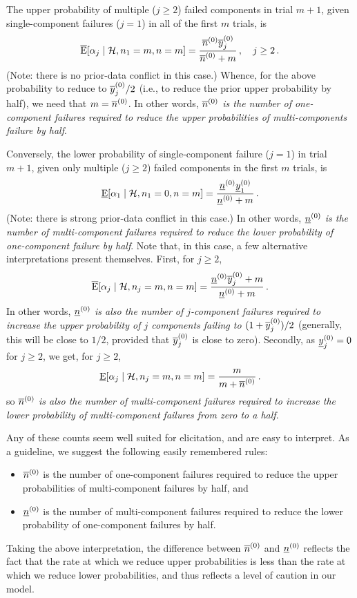 The upper probability of multiple ($j\ge 2$) failed components in trial $m+1$,
given single-component failures ($j=1$) in all of the first $m$ trials, is
\begin{equation*}
  \overline{\operatorname{E}}[\alpha_j\mid\mathcal{H}, n_1=m, n=m] = \frac{\overline{n}^{(0)}\overline{y}^{(0)}_j}{\overline{n}^{(0)} + m}\,, \quad j \ge 2\,.
\end{equation*}
(Note: there is no prior-data conflict in this case.)
Whence, for the above probability to reduce to $\overline{y}^{(0)}_j/2$
(i.e., to reduce the prior upper probability by half), we need that $m=\overline{n}^{(0)}$.
In other words, \emph{$\overline{n}^{(0)}$ is the number of one-component failures required
to reduce the upper probabilities of multi-components failure by half}.

Conversely, the lower probability of single-component failure ($j=1$) in trial $m+1$,
given only multiple ($j\ge 2$) failed components in the first $m$ trials,
is
\begin{equation*}
  \underline{\operatorname{E}}[\alpha_1\mid\mathcal{H}, n_1=0, n=m] = \frac{\underline{n}^{(0)}\underline{y}^{(0)}_1}{\underline{n}^{(0)} + m}\,.
\end{equation*}
(Note: there is strong prior-data conflict in this case.)
%
In other words, \emph{$\underline{n}^{(0)}$ is the number of multi-component failures required
to reduce the lower probability of one-component failure by half}.
%
Note that, in this case, a few alternative interpretations present themselves.
First, for $j \ge 2$,
\begin{equation*}
  \overline{\operatorname{E}}[\alpha_j\mid\mathcal{H}, n_j=m, n=m] = \frac{\underline{n}^{(0)}\overline{y}^{(0)}_j + m}{\underline{n}^{(0)} + m}\,.
\end{equation*}
In other words, \emph{$\underline{n}^{(0)}$ is also the number of $j$-component failures required
to increase the upper probability of $j$ components failing to $(1+\overline{y}^{(0)}_j)/2$}
(generally, this will be close to $1/2$, provided that $\overline{y}^{(0)}_j$ is close to zero).
%
Secondly, as $\underline{y}^{(0)}_j = 0$ for $j \ge 2$, we get, for $j \ge 2$,
\begin{equation*}
  \underline{\operatorname{E}}[\alpha_j\mid\mathcal{H}, n_j=m, n=m] = \frac{m}{m+\overline{n}^{(0)}}\,.
\end{equation*}
so \emph{$\overline{n}^{(0)}$ is also the number of multi-component failures required
to increase the lower probability of multi-component failures from zero to a half}.

Any of these counts seem well suited for elicitation, and are easy to interpret.
As a guideline, we suggest the following easily remembered rules:
\begin{itemize}
\item $\overline{n}^{(0)}$ is the number of one-component failures required to reduce
the upper probabilities of multi-component failures by half, and
\item $\underline{n}^{(0)}$ is the number of multi-component failures required to reduce
the lower probability of one-component failures by half.
\end{itemize}
Taking the above interpretation, the difference between $\overline{n}^{(0)}$ and $\underline{n}^{(0)}$
reflects the fact that the rate at which we reduce upper probabilities
is less than the rate at which we reduce lower probabilities,
and thus reflects a level of caution in our model.

